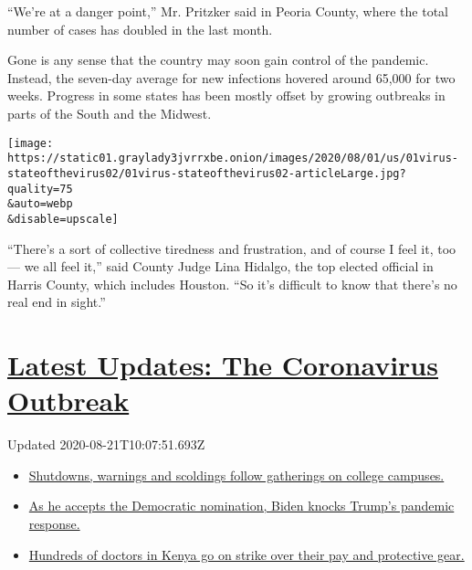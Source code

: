 ``We're at a danger point,'' Mr. Pritzker said in Peoria County, where
the total number of cases has doubled in the last month.

Gone is any sense that the country may soon gain control of the
pandemic. Instead, the seven-day average for new infections hovered
around 65,000 for two weeks. Progress in some states has been mostly
offset by growing outbreaks in parts of the South and the Midwest.

\texttt{[image: https://static01.graylady3jvrrxbe.onion/images/2020/08/01/us/01virus-stateofthevirus02/01virus-stateofthevirus02-articleLarge.jpg?quality=75\\\&auto=webp\\\&disable=upscale]}

``There's a sort of collective tiredness and frustration, and of course
I feel it, too --- we all feel it,'' said County Judge Lina Hidalgo, the
top elected official in Harris County, which includes Houston. ``So it's
difficult to know that there's no real end in sight.''

\hypertarget{latest-updates-the-coronavirus-outbreak}{%
\section{\texorpdfstring{\href{https://www.nytimes3xbfgragh.onion/2020/08/21/world/covid-19-coronavirus.html?action=click\&pgtype=Article\&state=default\&region=MAIN_CONTENT_1\&context=storylines_live_updates}{Latest
Updates: The Coronavirus
Outbreak}}{Latest Updates: The Coronavirus Outbreak}}\label{latest-updates-the-coronavirus-outbreak}}

Updated 2020-08-21T10:07:51.693Z

\begin{itemize}
\tightlist
\item
  \href{https://www.nytimes3xbfgragh.onion/2020/08/21/world/covid-19-coronavirus.html?action=click\&pgtype=Article\&state=default\&region=MAIN_CONTENT_1\&context=storylines_live_updates\#link-4690b6aa}{Shutdowns,
  warnings and scoldings follow gatherings on college campuses.}
\item
  \href{https://www.nytimes3xbfgragh.onion/2020/08/21/world/covid-19-coronavirus.html?action=click\&pgtype=Article\&state=default\&region=MAIN_CONTENT_1\&context=storylines_live_updates\#link-324af071}{As
  he accepts the Democratic nomination, Biden knocks Trump's pandemic
  response.}
\item
  \href{https://www.nytimes3xbfgragh.onion/2020/08/21/world/covid-19-coronavirus.html?action=click\&pgtype=Article\&state=default\&region=MAIN_CONTENT_1\&context=storylines_live_updates\#link-35890b73}{Hundreds
  of doctors in Kenya go on strike over their pay and protective gear.}
\end{itemize}


